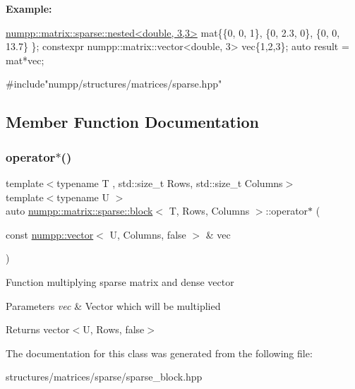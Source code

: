 {\bfseries Example\+:} 
\begin{DoxyCode}
\hyperlink{classnumpp_1_1matrix_1_1sparse_1_1nested}{numpp::matrix::sparse::nested<double, 3,3>} mat\{\{0,  0,   1\},
                                                \{0,  2.3, 0\},
                                                \{0,  0,   13.7\}
                                               \};
constexpr numpp::matrix::vector<double, 3> vec\{1,2,3\};
\textcolor{keyword}{auto} result = mat*vec;
\end{DoxyCode}



\begin{DoxyCode}
\textcolor{preprocessor}{#include"numpp/structures/matrices/sparse.hpp"}
\end{DoxyCode}
 

\subsection{Member Function Documentation}
\mbox{\label{classnumpp_1_1matrix_1_1sparse_1_1block_a9ee2ec26bf97fe00dfc11957de26156c}} 
\subsubsection{\texorpdfstring{operator$\ast$()}{operator*()}}
{\footnotesize\ttfamily template$<$typename T , std\+::size\+\_\+t Rows, std\+::size\+\_\+t Columns$>$ \\
template$<$typename U $>$ \\
auto \hyperlink{classnumpp_1_1matrix_1_1sparse_1_1block}{numpp\+::matrix\+::sparse\+::block}$<$ T, Rows, Columns $>$\+::operator$\ast$ (\begin{DoxyParamCaption}\item[{const \hyperlink{classnumpp_1_1vector}{numpp\+::vector}$<$ U, Columns, false $>$ \&}]{vec }\end{DoxyParamCaption})\hspace{0.3cm}{\ttfamily [inline]}}

Function multiplying sparse matrix and dense vector


\begin{DoxyParams}{Parameters}
{\em vec} & Vector which will be multiplied \\
\hline
\end{DoxyParams}
\begin{DoxyReturn}{Returns}
vector$<$\+U, Rows, false$>$ 
\end{DoxyReturn}


The documentation for this class was generated from the following file\+:\begin{DoxyCompactItemize}
\item 
structures/matrices/sparse/sparse\+\_\+block.\+hpp\end{DoxyCompactItemize}
